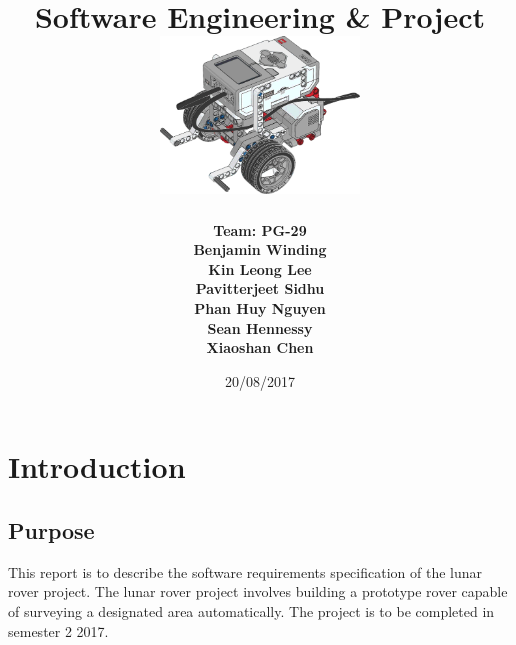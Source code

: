 \documentclass[10pt,a4paper,titlepage]{article}
\begin{document}
	
	\begin{titlepage}
		
		\title{
			\fontsize{50}{12}\\
			\vspace{20pt}
			\fontsize{20}{12}\\
			\vspace{10pt}
			\large{Software Engineering \& Project} \\
			\vspace{20pt}
			\includegraphics[width=200px]{title-page-ev3.png}					
		}
		\date{20/08/2017}
		\author{
			\bf{Team: PG-29} \\
			Benjamin Winding \\
			Kin Leong Lee \\
			Pavitterjeet Sidhu \\
			Phan Huy Nguyen \\
			Sean Hennessy \\
			Xiaoshan Chen \\
		}
		\maketitle
		
	\end{titlepage}
	
	\tableofcontents
	\listoffigures
	\newpage
	
	\section{Introduction}
	\subsection{Purpose}
	This report is to describe the software requirements specification of the lunar rover project. The lunar rover project involves building a prototype rover capable of surveying a designated area automatically. The project is to be completed in semester 2 2017.
	
\end{document}
